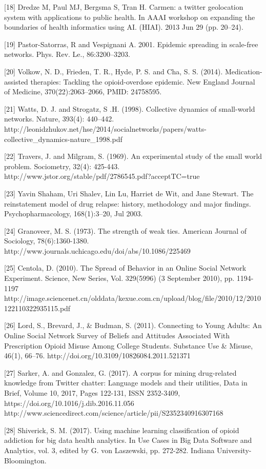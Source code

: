 [18] Dredze M, Paul MJ, Bergsma S, Tran H. Carmen: a twitter geolocation system with applications to public health. In AAAI workshop on expanding the boundaries of health informatics using AI. (HIAI). 2013 Jun 29 (pp. 20–24).


[19] Pastor-Satorras, R and Vespignani A. 2001. Epidemic spreading in scale-free networks. Phys. Rev. Le., 86:3200–3203.

[20] Volkow, N. D., Frieden, T. R., Hyde, P. S. and Cha, S. S. (2014). Medication-assisted therapies: Tackling the opioid-overdose epidemic. New England Journal of Medicine, 370(22):2063–2066, PMID: 24758595.

[21] Watts, D. J. and Strogatz, S .H. (1998). Collective dynamics of small-world networks. Nature, 393(4): 440–442. http://leonidzhukov.net/hse/2014/socialnetworks/papers/watts-collective_dynamics-nature_1998.pdf 

[22] Travers, J. and Milgram, S. (1969). An experimental study of the small world problem. Sociometry, 32(4): 425-443. http://www.jstor.org/stable/pdf/2786545.pdf?acceptTC=true 

[23] Yavin Shaham, Uri Shalev, Lin Lu, Harriet de Wit, and Jane Stewart. The reinstatement model of drug relapse: history, methodology and major findings. Psychopharmacology, 168(1):3–20, Jul 2003.

[24] Granoveer, M. S. (1973). The strength of weak ties. American Journal of Sociology, 78(6):1360-1380. 
http://www.journals.uchicago.edu/doi/abs/10.1086/225469 

[25] Centola, D. (2010). The Spread of Behavior in an Online Social Network Experiment. Science, New Series, Vol. 329(5996) (3 September 2010), pp. 1194-1197
http://image.sciencenet.cn/olddata/kexue.com.cn/upload/blog/file/2010/12/2010122110322935115.pdf 

[26] Lord, S., Brevard, J., & Budman, S. (2011). Connecting to Young Adults: An Online Social Network Survey of Beliefs and Attitudes Associated With Prescription Opioid Misuse Among College Students. Substance Use & Misuse, 46(1), 66–76. http://doi.org/10.3109/10826084.2011.521371 

[27] Sarker, A. and Gonzalez, G. (2017). A corpus for mining drug-related knowledge from Twitter chatter: Language models and their utilities, Data in Brief, Volume 10, 2017, Pages 122-131, ISSN 2352-3409, https://doi.org/10.1016/j.dib.2016.11.056 
http://www.sciencedirect.com/science/article/pii/S2352340916307168

[28] Shiverick, S. M. (2017). Using machine learning classification of opioid addiction for big data health analytics. In Use Cases in Big Data Software and Analytics,  vol. 3, edited by G. von Laszewski, pp. 272-282. Indiana University-Bloomington.
